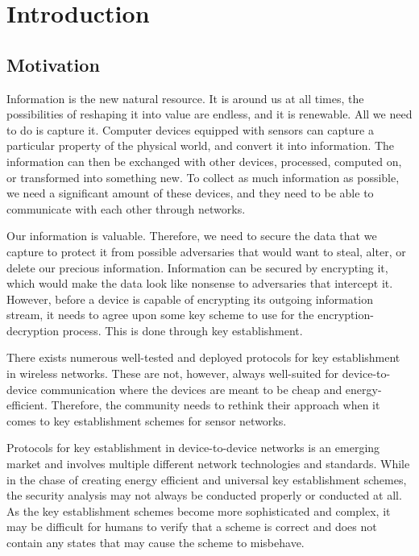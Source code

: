 \chapter{Introduction}
\label{chp:introduction} 


\section{Motivation}


Information is the new natural resource. It is around us at all times, the possibilities of reshaping it into value are endless, and it is renewable. All we need to do is capture it. Computer devices equipped with sensors can capture a particular property of the physical world, and convert it into information. The information can then be exchanged with other devices, processed, computed on, or transformed into something new. To collect as much information as possible, we need a significant amount of these devices, and they need to be able to communicate with each other through networks. 

Our information is valuable. Therefore, we need to secure the data that we capture to protect it from possible adversaries that would want to steal, alter, or delete our precious information. Information can be secured by encrypting it, which would make the data look like nonsense to adversaries that intercept it. However, before a device is capable of encrypting its outgoing information stream, it needs to agree upon some key scheme to use for the encryption-decryption process. This is done through key establishment. 

There exists numerous well-tested and deployed protocols for key establishment in wireless networks. These are not, however, always well-suited for device-to-device communication where the devices are meant to be cheap and energy-efficient. Therefore, the community needs to rethink their approach when it comes to key establishment schemes for sensor networks.

Protocols for key establishment in device-to-device networks is an emerging market and involves multiple different network technologies and standards. While in the chase of creating energy efficient and universal key establishment schemes, the security analysis may not always be conducted properly or conducted at all. As the key establishment schemes become more sophisticated and complex, it may be difficult for humans to verify that a scheme is correct and does not contain any states that may cause the scheme to misbehave.

